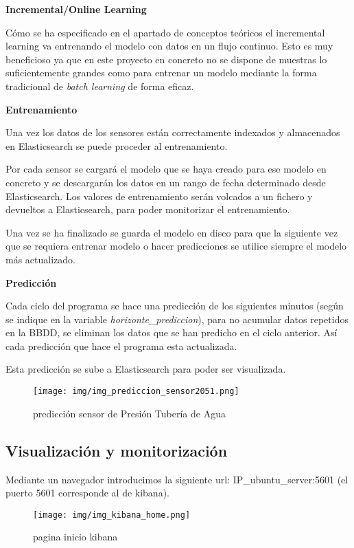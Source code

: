 \textbf{Incremental/Online Learning}

Cómo se ha especificado en el apartado de conceptos teóricos el incremental learning va entrenando el modelo con datos en un flujo continuo. Esto es muy beneficioso ya que en este proyecto en concreto no se dispone de muestras lo suficientemente grandes como para entrenar un modelo mediante la forma tradicional de \textit{batch learning} de forma eficaz. 

\textbf{Entrenamiento}

Una vez los datos de los sensores están correctamente indexados y almacenados en Elasticsearch se puede proceder al entrenamiento.

Por cada sensor se cargará el modelo que se haya creado para ese modelo en concreto y se descargarán los datos en un rango de fecha determinado desde Elasticsearch. Los valores de entrenamiento serán volcados a un fichero y devueltos a Elasticsearch, para poder monitorizar el entrenamiento.

Una vez se ha finalizado se guarda el modelo en disco para que la siguiente vez que se requiera entrenar modelo o hacer predicciones se utilice siempre el modelo más actualizado.

\textbf{Predicción}

Cada ciclo del programa se hace una predicción de los siguientes minutos (según se indique en la variable \textit{horizonte\_prediccion}), para no acumular datos repetidos en la BBDD, se eliminan los datos que se han predicho en el ciclo anterior. Así cada predicción que hace el programa esta actualizada.

Esta predicción se sube a Elasticsearch para poder ser visualizada.

\begin{figure}[h]
	\centering
	\texttt{[image: img/img\_prediccion\_sensor2051.png]}
	\caption{predicción sensor de Presión Tubería de Agua}
	\label{img_prediccion_sensor2051}
\end{figure}
\newpage


\subsection{Visualización y monitorización}

Mediante un navegador introducimos la siguiente url: IP\_ubuntu\_server:5601 (el puerto 5601 corresponde al de kibana).

\begin{figure}[h]
	\centering
	\texttt{[image: img/img\_kibana\_home.png]}
	\caption{pagina inicio kibana}
	\label{img_kibana_home}
\end{figure}

